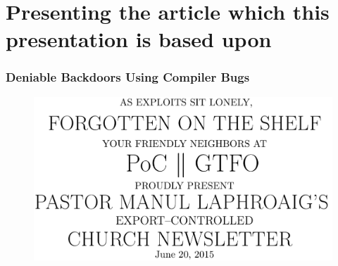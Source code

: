 \section{Presenting the article which this presentation is based upon}

\begin{frame}
  \frametitle{Deniable Backdoors Using Compiler Bugs}
  \begin{figure}
    \centering
      \includegraphics[scale=0.25]{input/content/figures/pocogtfo.pdf}
  \end{figure}

%
\end{frame}
